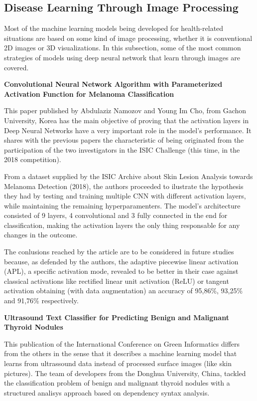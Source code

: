 \documentclass[10pt]{IEEEtran}
\begin{document}
\subsection{Disease Learning Through Image Processing}

Most of the machine learning models being developed for health-related situations are based on some kind of image processing, whether it is conventional 2D images or 3D visualizations.
In this subsection, some of the most common strategies of models using deep neural network that learn through images are covered.

\textbf{Convolutional Neural Network Algorithm with Parameterized Activation Function for Melanoma Classification}

This paper published by Abdulaziz Namozov and Young Im Cho, from Gachon University, Korea has the main objective of proving that the activation layers in Deep Neural Networks have a very important role in the model's performance.
It shares with the previous papers the characteristic of being originated from the participation of the two investigators in the ISIC Challenge (this time, in the 2018 competition).

From a dataset supplied by the ISIC Archive about Skin Lesion Analysis towards Melanoma Detection (2018), the authors proceeded to ilustrate the hypothesis they had by testing and training multiple CNN with different activation layers, while maintaining the remaining hyperparamenters. The model's architecture consisted of 9 layers, 4 convolutional and 3 fully connected in the end for classification, making the activation layers the only thing responsable for any changes in the outcome.

The conlusions reached by the article are to be considered in future studies because, as defended by the authors, the adaptive piecewise linear activation (APL), a specific activation mode, revealed to be better in their case against classical activations like rectified linear unit activation (ReLU) or tangent activation obtaining (with data augmentation) an accuracy of 95,86\%, 93,25\% and 91,76\% respectively.

\textbf{Ultrasound Text Classifier for Predicting Benign and Malignant Thyroid Nodules}

This publication of the International Conference on Green Informatics differs from the others in the sense that it describes a machine learning model that learns from ultrassound data instead of processed surface images (like skin pictures).
The team of developers from the Donghua University, China, tackled the classification problem of benign and malignant thyroid nodules with a structured analisys approach based on dependency syntax analysis.
\end{document}
